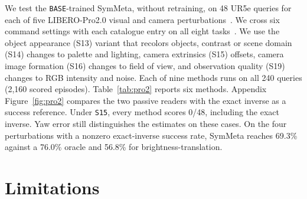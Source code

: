 \documentclass{article}
\theoremstyle{plain}
\theoremstyle{remark}
\begin{document}
We test the \texttt{BASE}-trained SymMeta, without retraining, on 48 UR5e queries for each of five LIBERO-Pro2.0 visual and camera perturbations~\citep{liberopro2026}. We cross six command settings with each catalogue entry on all eight tasks~\citep[Table~15]{liberopro2026}. We use the object appearance (S13) variant that recolors objects, contrast or scene domain (S14) changes to palette and lighting, camera extrinsics (S15) offsets, camera image formation (S16) changes to field of view, and observation quality (S19) changes to RGB intensity and noise. Each of nine methods runs on all 240 queries (2,160 scored episodes). Table~\ref{tab:pro2} reports six methods. Appendix Figure~\ref{fig:pro2} compares the two passive readers with the exact inverse as a success reference.
Under \texttt{S15}, every method scores 0/48, including the exact inverse. Yaw error still distinguishes the estimates on these cases. On the four perturbations with a nonzero exact-inverse success rate, SymMeta reaches 69.3\% against a 76.0\% oracle and 56.8\% for brightness-translation.

\section{Limitations}
\label{sec:limits}
\end{document}
